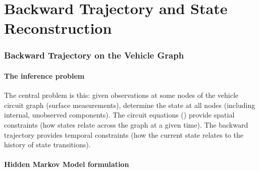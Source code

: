 \documentclass[twocolumn,10pt,a4paper]{article}
\theoremstyle{definition}
\theoremstyle{remark}
\begin{document}

\part{Backward Trajectory and State Reconstruction}

\section{Backward Trajectory on the Vehicle Graph}\label{sec:backward}

\subsection{The inference problem}

The central problem is this: given observations at some nodes of the vehicle circuit graph (surface measurements), determine the state at all nodes (including internal, unobserved components). The circuit equations () provide spatial constraints (how states relate across the graph at a given time). The backward trajectory provides temporal constraints (how the current state relates to the history of state transitions).

\subsection{Hidden Markov Model formulation}
\end{document}
